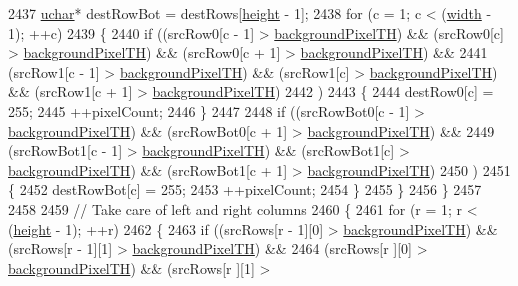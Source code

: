 \begin{DoxyCode}
2437     \hyperlink{namespace_k_k_b_ace9969169bf514f9ee6185186949cdf7}{uchar}*  destRowBot = destRows[\hyperlink{class_k_k_b_1_1_raster_af39ff189de4fbb6de98392e187efafb7}{height} - 1];
2438     \textcolor{keywordflow}{for} (c = 1;  c < (\hyperlink{class_k_k_b_1_1_raster_ae0bcc103e191c3421d7692dc69ceb554}{width}  - 1);  ++c)
2439     \{
2440       \textcolor{keywordflow}{if}  ((srcRow0[c - 1] > \hyperlink{class_k_k_b_1_1_raster_a3c4e96eaf48274f5d8912617f81f2a0b}{backgroundPixelTH})  &&  (srcRow0[c] > 
      \hyperlink{class_k_k_b_1_1_raster_a3c4e96eaf48274f5d8912617f81f2a0b}{backgroundPixelTH})  &&  (srcRow0[c + 1] > \hyperlink{class_k_k_b_1_1_raster_a3c4e96eaf48274f5d8912617f81f2a0b}{backgroundPixelTH})  &&
2441            (srcRow1[c - 1] > \hyperlink{class_k_k_b_1_1_raster_a3c4e96eaf48274f5d8912617f81f2a0b}{backgroundPixelTH})  &&  (srcRow1[c] > 
      \hyperlink{class_k_k_b_1_1_raster_a3c4e96eaf48274f5d8912617f81f2a0b}{backgroundPixelTH})  &&  (srcRow1[c + 1] > \hyperlink{class_k_k_b_1_1_raster_a3c4e96eaf48274f5d8912617f81f2a0b}{backgroundPixelTH})
2442           )
2443       \{
2444         destRow0[c] = 255;
2445         ++pixelCount;
2446       \}
2447 
2448       \textcolor{keywordflow}{if}  ((srcRowBot0[c - 1] > \hyperlink{class_k_k_b_1_1_raster_a3c4e96eaf48274f5d8912617f81f2a0b}{backgroundPixelTH})  &&                                    
             (srcRowBot0[c + 1] > \hyperlink{class_k_k_b_1_1_raster_a3c4e96eaf48274f5d8912617f81f2a0b}{backgroundPixelTH})  &&
2449            (srcRowBot1[c - 1] > \hyperlink{class_k_k_b_1_1_raster_a3c4e96eaf48274f5d8912617f81f2a0b}{backgroundPixelTH})  &&  (srcRowBot1[c] > 
      \hyperlink{class_k_k_b_1_1_raster_a3c4e96eaf48274f5d8912617f81f2a0b}{backgroundPixelTH})  &&  (srcRowBot1[c + 1] > \hyperlink{class_k_k_b_1_1_raster_a3c4e96eaf48274f5d8912617f81f2a0b}{backgroundPixelTH})
2450           )
2451       \{
2452         destRowBot[c] = 255;
2453         ++pixelCount;
2454       \}
2455     \}
2456   \}
2457 
2458 
2459   \textcolor{comment}{// Take care of left and right columns}
2460   \{
2461     \textcolor{keywordflow}{for}  (r = 1;  r < (\hyperlink{class_k_k_b_1_1_raster_af39ff189de4fbb6de98392e187efafb7}{height} - 1);  ++r)
2462     \{
2463       \textcolor{keywordflow}{if}  ((srcRows[r - 1][0] > \hyperlink{class_k_k_b_1_1_raster_a3c4e96eaf48274f5d8912617f81f2a0b}{backgroundPixelTH})  &&  (srcRows[r - 1][1] > 
      \hyperlink{class_k_k_b_1_1_raster_a3c4e96eaf48274f5d8912617f81f2a0b}{backgroundPixelTH})  &&
2464            (srcRows[r    ][0] > \hyperlink{class_k_k_b_1_1_raster_a3c4e96eaf48274f5d8912617f81f2a0b}{backgroundPixelTH})  &&  (srcRows[r    ][1] > 

\end{DoxyCode}

